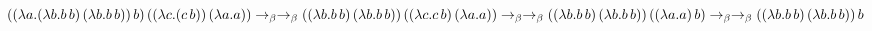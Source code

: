 \documentclass[12pt]{article}
\begin{document}
	\Large
	$((\lambda a.(\lambda b.b\,b)\,(\lambda b.b\,b))\,b)\,((\lambda c.(c\,b))\,(\lambda a.a)) \to_\beta
	\\* \to_\beta ((\lambda b.b\,b)\,(\lambda b.b\,b))\,((\lambda c.c\,b)\,(\lambda a.a)) \to_\beta
	\\* \to_\beta ((\lambda b.b\,b)\,(\lambda b.b\,b))\,((\lambda a.a)\,b) \to_\beta 
	\\* \to_\beta ((\lambda b.b\,b)\,(\lambda b.b\,b))\,b$
\end{document}
